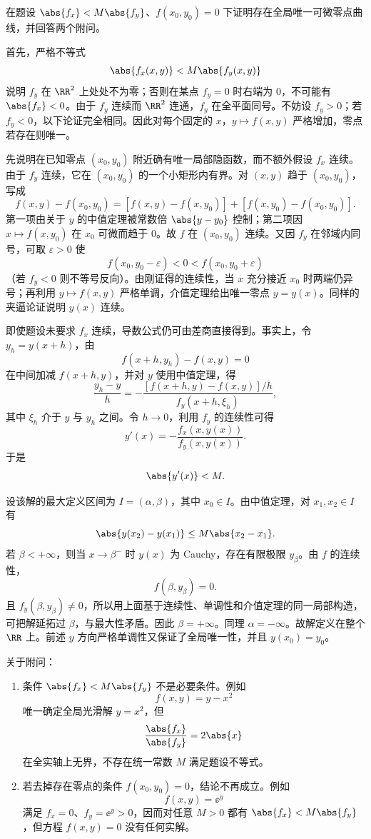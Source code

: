 \begin{xreferenceproblem}[20.5.2 第一组参考题 5]
在题设 $\abs{f_x}<M\abs{f_y}$、$f(x_0,y_0)=0$ 下证明存在全局唯一可微零点曲线，并回答两个附问。
\end{xreferenceproblem}
\begin{xsolution}
首先，严格不等式
\[
  \abs{f_x(x,y)}<M\abs{f_y(x,y)}
\]
说明 $f_y$ 在 $\RR^2$ 上处处不为零；否则在某点 $f_y=0$ 时右端为 $0$，不可能有 $\abs{f_x}<0$。由于 $f_y$ 连续而 $\RR^2$ 连通，$f_y$ 在全平面同号。不妨设 $f_y>0$；若 $f_y<0$，以下论证完全相同。因此对每个固定的 $x$，$y\mapsto f(x,y)$ 严格增加，零点若存在则唯一。

先说明在已知零点 $(x_0,y_0)$ 附近确有唯一局部隐函数，而不额外假设 $f_x$ 连续。由于 $f_y$ 连续，它在 $(x_0,y_0)$ 的一个小矩形内有界。对 $(x,y)$ 趋于 $(x_0,y_0)$，写成
\[
  f(x,y)-f(x_0,y_0)
  =[f(x,y)-f(x,y_0)]+[f(x,y_0)-f(x_0,y_0)].
\]
第一项由关于 $y$ 的中值定理被常数倍 $\abs{y-y_0}$ 控制；第二项因 $x\mapsto f(x,y_0)$ 在 $x_0$ 可微而趋于 $0$。故 $f$ 在 $(x_0,y_0)$ 连续。又因 $f_y$ 在邻域内同号，可取 $\varepsilon>0$ 使
\[
  f(x_0,y_0-\varepsilon)<0<f(x_0,y_0+\varepsilon)
\]
（若 $f_y<0$ 则不等号反向）。由刚证得的连续性，当 $x$ 充分接近 $x_0$ 时两端仍异号；再利用 $y\mapsto f(x,y)$ 严格单调，介值定理给出唯一零点 $y=y(x)$。同样的夹逼论证说明 $y(x)$ 连续。

即使题设未要求 $f_x$ 连续，导数公式仍可由差商直接得到。事实上，令 $y_h=y(x+h)$，由
\[
  f(x+h,y_h)-f(x,y)=0
\]
在中间加减 $f(x+h,y)$，并对 $y$ 使用中值定理，得
\[
  \frac{y_h-y}{h}
  =-\frac{[f(x+h,y)-f(x,y)]/h}{f_y(x+h,\xi_h)},
\]
其中 $\xi_h$ 介于 $y$ 与 $y_h$ 之间。令 $h\to0$，利用 $f_y$ 的连续性可得
\[
  y'(x)=-\frac{f_x(x,y(x))}{f_y(x,y(x))}.
\]
于是
\[
  \abs{y'(x)}<M.
\]

设该解的最大定义区间为 $I=(\alpha,\beta)$，其中 $x_0\in I$。由中值定理，对 $x_1,x_2\in I$ 有
\[
  \abs{y(x_2)-y(x_1)}\le M\abs{x_2-x_1}.
\]
若 $\beta<+\infty$，则当 $x\to\beta^-$ 时 $y(x)$ 为 Cauchy，存在有限极限 $y_\beta$。由 $f$ 的连续性，
\[
  f(\beta,y_\beta)=0.
\]
且 $f_y(\beta,y_\beta)\ne0$，所以用上面基于连续性、单调性和介值定理的同一局部构造，可把解延拓过 $\beta$，与最大性矛盾。因此 $\beta=+\infty$。同理 $\alpha=-\infty$。故解定义在整个 $\RR$ 上。前述 $y$ 方向严格单调性又保证了全局唯一性，并且 $y(x_0)=y_0$。

关于附问：
\begin{enumerate}[label=(\arabic*)]
  \item 条件 $\abs{f_x}<M\abs{f_y}$ 不是必要条件。例如
  \[
    f(x,y)=y-x^2
  \]
  唯一确定全局光滑解 $y=x^2$，但
  \[
    \frac{\abs{f_x}}{\abs{f_y}}=2\abs{x}
  \]
  在全实轴上无界，不存在统一常数 $M$ 满足题设不等式。
  \item 若去掉存在零点的条件 $f(x_0,y_0)=0$，结论不再成立。例如
  \[
    f(x,y)=\ee^y
  \]
  满足 $f_x=0$、$f_y=\ee^y>0$，因而对任意 $M>0$ 都有 $\abs{f_x}<M\abs{f_y}$，但方程 $f(x,y)=0$ 没有任何实解。
\end{enumerate}
\end{xsolution}

